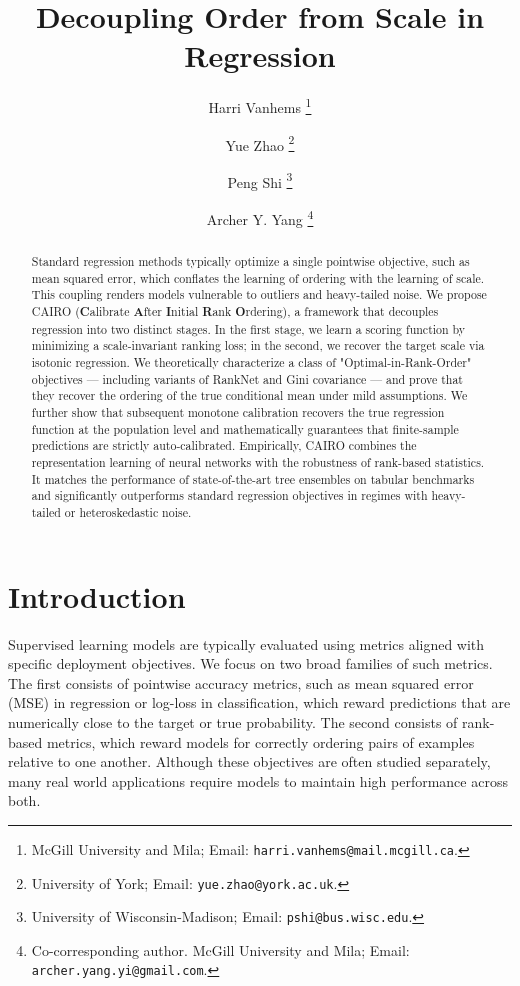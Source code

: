 \documentclass[11pt]{article}
\theoremstyle{plain}
\theoremstyle{plain}
\theoremstyle{plain}
\theoremstyle{plain}
\theoremstyle{plain}
\theoremstyle{plain}
\theoremstyle{plain}
\begin{document}

\title{Decoupling Order from Scale in Regression}

\author{Harri Vanhems \thanks{McGill University and Mila; Email:  \texttt{harri.vanhems@mail.mcgill.ca}.}
\and 
Yue Zhao \thanks{University of York; Email: \texttt{yue.zhao@york.ac.uk}.}
\and
Peng Shi \thanks{University of Wisconsin-Madison; Email: \texttt{pshi@bus.wisc.edu}.}
\and
Archer Y. Yang \thanks{Co-corresponding author. McGill University and Mila; Email: \texttt{archer.yang.yi@gmail.com}.}
}
\maketitle 

\begin{abstract}
Standard regression methods typically optimize a single pointwise objective, such as mean squared error, which conflates the learning of ordering with the learning of scale. This coupling renders models vulnerable to outliers and heavy-tailed noise. We propose \textsc{CAIRO} (\textbf{C}alibrate \textbf{A}fter \textbf{I}nitial \textbf{R}ank \textbf{O}rdering), a framework that decouples regression into two distinct stages. In the first stage, we learn a scoring function by minimizing a scale-invariant ranking loss; in the second, we recover the target scale via isotonic regression. We theoretically characterize a class of "Optimal-in-Rank-Order" objectives --- including variants of RankNet and Gini covariance --- and prove that they recover the ordering of the true conditional mean under mild assumptions. We further show that subsequent monotone calibration recovers the true regression function at the population level and mathematically guarantees that finite-sample predictions are strictly auto-calibrated. Empirically, CAIRO combines the representation learning of neural networks with the robustness of rank-based statistics. It matches the performance of state-of-the-art tree ensembles on tabular benchmarks and significantly outperforms standard regression objectives in regimes with heavy-tailed or heteroskedastic noise.


 
\end{abstract}

\section{Introduction}
\label{sec: intro}
Supervised learning models are typically evaluated using metrics aligned with specific deployment objectives. We focus on two broad families of such metrics. The first consists of pointwise accuracy metrics, such as mean squared error (MSE) in regression or log-loss in classification, which reward predictions that are numerically close to the target or true probability. The second consists of rank-based metrics, which reward models for correctly ordering pairs of examples relative to one another. Although these objectives are often studied separately, many real world applications require models to maintain high performance across both.
\end{document}
